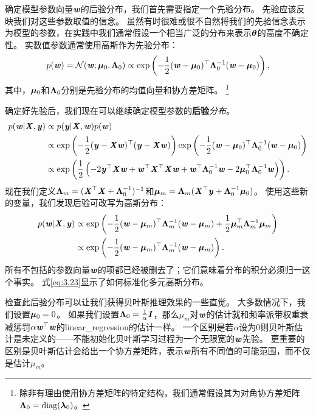 
确定模型参数向量$\Vw$的后验分布，我们首先需要指定一个先验分布。
先验应该反映我们对这些参数取值的信念。
虽然有时很难或很不自然将我们的先验信念表示为模型的参数，在实践中我们通常假设一个相当广泛的分布来表示$\Vtheta$的高度不确定性。
实数值参数通常使用高斯作为先验分布：
\begin{equation}
    p(\Vw) = \mathcal{N}( \Vw; \Vmu_0, \VLambda_0 ) 
    \propto \exp\left( 
    -\frac{1}{2}( \Vw-\Vmu_0 )^\Tsp \VLambda_0^{-1} ( \Vw-\Vmu_0 )
    \right),
\end{equation}
其中，$\Vmu_0$和$\VLambda_0$分别是先验分布的均值向量和协方差矩阵。
\footnote{除非有理由使用协方差矩阵的特定结构，我们通常假设其为对角协方差矩阵
$\VLambda_0=\text{diag}(\Vlambda_0)$。
}

确定好先验后，我们现在可以继续确定模型参数的\textbf{后验}\emph{分布}。
\begin{align}
    p(\Vw | \MX, \Vy) &\propto p(\Vy | \MX, \Vw) p(\Vw) \\
    & \propto 
        \exp\left( 
            -\frac{1}{2} ( \Vy - \MX\Vw )^\Tsp( \Vy - \MX\Vw )
        \right)
        \exp\left(
    -\frac{1}{2} ( \Vw - \Vmu_0)^\Tsp \VLambda_0^{-1} ( \Vw - \Vmu_0)
        \right) \\
    & \propto \exp
    \left(
    \frac{1}{2}\left(
    -2\Vy^\Tsp\MX\Vw + \Vw^\Tsp\MX^\Tsp\MX\Vw + \Vw^\Tsp\VLambda_0^{-1}\Vw - 
    2\Vmu_0^\Tsp \VLambda_0^{-1}\Vw
    \right)
    \right).
\end{align}
现在我们定义$\VLambda_m = (\MX^\Tsp\MX + \VLambda_0^{-1})^{-1}$和$\Vmu_m = \VLambda_m ( \MX^\Tsp \Vy + \VLambda_0^{-1}\Vmu_0 )$。
使用这些新的变量，我们发现后验可改写为高斯分布：
\begin{align}
    p(\Vw | \MX, \Vy) &\propto \exp \left(
    -\frac{1}{2} (\Vw - \Vmu_m )^\Tsp \VLambda_m^{-1}  (\Vw - \Vmu_m ) 
    + \frac{1}{2} \Vmu_m^\Tsp \VLambda_m^{-1}  \Vmu_m 
    \right) \\
    &\propto \exp\left(
    -\frac{1}{2} (\Vw - \Vmu_m)^\Tsp \VLambda_m^{-1} (\Vw - \Vmu_m)
    \right).
\end{align}
所有不包括的参数向量$\Vw$的项都已经被删去了；它们意味着分布的积分必须归一这个事实。
式\ref{eq:3.23}显示了如何标准化多元高斯分布。


检查此后验分布可以让我们获得贝叶斯推理效果的一些直觉。
大多数情况下，我们设置$\Vmu_0 = 0$。
如果我们设置$\VLambda_0 = \frac{1}{\alpha}\MI$，那么$\mu_m$对$\Vw$的估计就和频率派带权重衰减惩罚$\alpha\Vw^\Tsp\Vw$的\gls{linear_regression}的估计一样。
一个区别是若$\alpha$设为$0$则贝叶斯估计是未定义的——不能初始化贝叶斯学习过程为一个无限宽的$\Vw$先验。
更重要的区别是贝叶斯估计会给出一个协方差矩阵，表示$\Vw$所有不同值的可能范围，而不仅是估计$\mu_m$。

